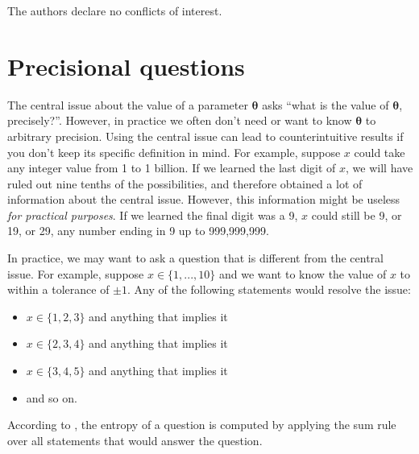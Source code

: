 \documentclass[entropy,article,accept,oneauthor,pdftex,10pt,a4paper]{mdpi}
\newcommand{\x}{\boldsymbol{\theta}}
\begin{document}



The authors declare no conflicts of interest.

%
\makeatletter
\renewcommand\@biblabel[1]{#1. }
\makeatother





\appendix
\section{Precisional questions}
\label{sec:precisional}

The central issue about the value of a parameter $\x$ asks
``what is the value of $\x$, precisely?''. However, in practice we often
don't need or want to know $\x$ to arbitrary precision. Using the central
issue can lead to counterintuitive results if you don't keep its specific
definition in mind. For example, suppose $x$ could take any integer value
from 1 to 1 billion. If we learned the last digit of $x$, we
will have ruled out nine tenths of the possibilities, and therefore obtained
a lot of information about the central issue. However,
this information might be useless {\em for practical purposes}.
If we learned the final
digit was a 9, $x$ could still be 9, or 19, or 29, any number ending in 9
up to 999,999,999.

In practice, we may
want to ask a question that is different from the central issue.
For example, suppose $x \in \{1, ..., 10\}$ and
we want to know the value of $x$ to within a tolerance
of $\pm 1$. Any of the following statements would
resolve the issue:
\begin{itemize}
\item $x \in \{1, 2, 3\}$ and anything that implies it
\item $x \in \{2, 3, 4\}$ and anything that implies it
\item $x \in \{3, 4, 5\}$ and anything that implies it
\item and so on.
\end{itemize}
According to \citet{knuth_questions}, the entropy of a question is
computed by applying the sum rule over all statements that would answer the
question.
\end{document}
